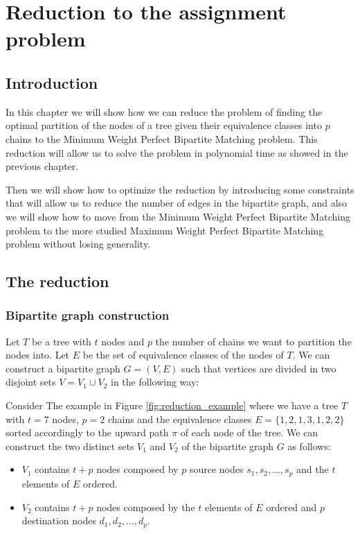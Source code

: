\chapter{Reduction to the assignment problem}

\section{Introduction}
In this chapter we will show how we can reduce the problem of finding the optimal partition of the nodes of a tree given their equivalence classes into $p$ chains to the Minimum Weight Perfect Bipartite Matching problem. This reduction will allow us to solve the problem in polynomial time as showed in the previous chapter.

Then we will show how to optimize the reduction by introducing some constraints that will allow us to reduce the number of edges in the bipartite graph, and also we will show how to move from the Minimum Weight Perfect Bipartite Matching problem to the more studied Maximum Weight Perfect Bipartite Matching problem without losing generality.

\section{The reduction}
\subsection{Bipartite graph construction}
Let $T$ be a tree with $t$ nodes and $p$ the number of chains we want to partition the nodes into. Let $E$ be the set of equivalence classes of the nodes of $T$. We can construct a bipartite graph $G = (V, E)$ such that vertices are divided in two disjoint sets $V = V_1 \cup V_2$ in the following way:

Consider The example in Figure \ref{fig:reduction_example} where we have a tree $T$ with $t=7$ nodes, $p = 2$ chains and the equivalence classes $E = \{1,2,1,3,1,2,2\}$ sorted accordingly to the upward path $\pi$ of each node of the tree. We can construct the two distinct sets $V_1$ and $V_2$ of the bipartite graph $G$ as follows:
\begin{itemize}
    \item $V_1$ contains $t + p$ nodes composed by $p$ source nodes $s_1, s_2, \dots, s_p$ and the $t$ elements of $E$ ordered.
    \item $V_2$ contains $t + p$ nodes composed by the $t$ elements of $E$ ordered and $p$ destination nodes $d_1, d_2, \dots, d_p$.
\end{itemize}

